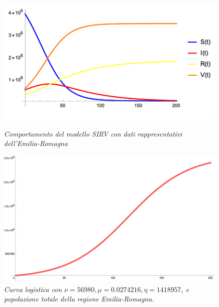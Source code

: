 \documentclass{article}
\begin{document}
\begin{figure}[h!]
\centering
\begin{minipage}[t]{.4\paperwidth}
    \hspace{-10pt}
    \includegraphics[width=\textwidth]{SIRV.png}
    \caption{\textit{Comportamento del modello SIRV con dati rappresentativi dell'Emilia-Romagna}}
    \label{fig::SIRV}
    \end{minipage}%
\hfill %
\begin{minipage}[t]{.4\paperwidth}
    \hspace{-10pt}
    \includegraphics[width=\textwidth]{vaccinati.png}
    \caption{\textit{Curva logistica con $\nu=56980, \mu=0.0274216, \eta=1418957$, e popolazione totale della regione Emilia-Romagna.}}
    \label{fig::vaccinati}
\end{minipage}
\end{figure}
\end{document}
